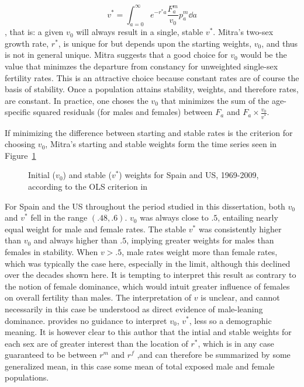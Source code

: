 \begin{equation}
v^\ast =  \int _{a = 0} ^\infty e ^{ -r^\ast a} \frac{F_a ^m}{v_0} p_a^m \dd a
\end{equation}
, that is: a given $v_0$ will always result in a single, stable $v^\ast$.
Mitra's two-sex growth rate, $r^\ast$, is unique for but depends upon the starting weights, $v_0$, and thus is not in general unique. Mitra suggests that a good choice for $v_0$ would be the value that minimzes the 
departure from constancy for unweighted single-sex fertility
rates. This is an attractive choice because constant rates are of course the
basis of stability. Once a population attains stability, weights, and therefore rates, are constant. In practice, one
choses the $v_0$ that minimizes the sum of the age-specific squared residuals
(for males and females) between $F_a$ and $F_a \times \tfrac{v_0}{v^\ast}$. 

If minimizing the difference between starting and stable rates is the criterion
for choosing $v_0$, Mitra's starting and stable weights form the time
series seen in Figure~\ref{fig:Mitra1978v0vstar}

\begin{figure}[ht!]
        \centering  
          \caption{Initial ($v_0$) and stable ($v^\ast$) weights for Spain and
          US, 1969-2009, according to the OLS criterion in
          \citet{mitra1978derivation}}
           \quad
          \label{fig:Mitra1978v0vstar}
\end{figure}

For Spain and the US throughout the period studied in this dissertation, both
$v_0$ and $v^\ast$ fell in the range $(.48,.6)$. $v_0$ was always
close to $.5$, entailing nearly equal weight for male and female rates.
The stable $v^\ast$ was consistently higher than $v_0$ and always higher than
$.5$, implying greater weights for males than females in stability. When $v > .5$, male rates weight
more than female rates, which was typically the case here, especially in the
limit, although this declined over the decades shown here. It is
tempting to interpret this result as contrary to the notion of female dominance,
which would intuit greater influence of females on overall fertility than
males. The interpretation of $v$ is unclear, and cannot necessarily in this case
be understood as direct evidence of male-leaning dominance.
\citet{mitra1978derivation} provides no guidance to interpret $v_0$, $v^\ast$,
less so a demographic meaning. It is however clear to this author that
the intial and stable weights for each sex are of greater interest
than the location of $r^\ast$, which is in any case guaranteed to be between
$r^m$ and $r^f$ ,and can therefore be summarized by some generalized mean, in
this case some mean of total exposed male and female populations.

